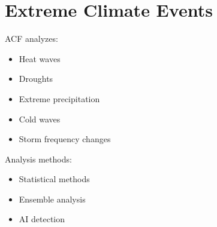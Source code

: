 \section{Extreme Climate Events}


ACF analyzes:


\begin{itemize}

\item Heat waves

\item Droughts

\item Extreme precipitation

\item Cold waves

\item Storm frequency changes

\end{itemize}



Analysis methods:


\begin{itemize}

\item Statistical methods

\item Ensemble analysis

\item AI detection

\end{itemize}

